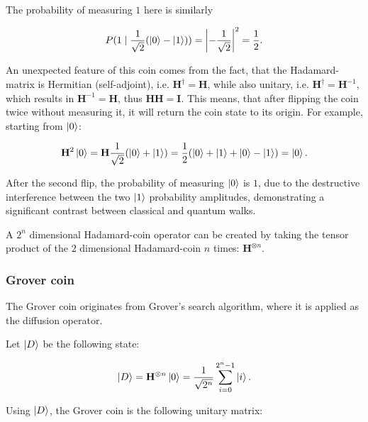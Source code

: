 The probability of measuring $1$ here is similarly

\begin{align*}
P(1 \mid \frac{1}{\sqrt{2}} (\ket{0} - \ket{1})) =
\left\lvert-\frac{1}{\sqrt{2}}\right\rvert^2 =
\frac{1}{2}.
\end{align*}

An unexpected feature of this coin comes from the fact, that the Hadamard-matrix is Hermitian (self-adjoint), i.e. $\mathbf{H}^{\dagger} = \mathbf{H}$, while also unitary, i.e. $\mathbf{H}^{\dagger} = \mathbf{H}^{-1}$, which results in $\mathbf{H}^{-1} = \mathbf{H}$, thus $\mathbf{H}\mathbf{H} = \mathbf{I}$. This means, that after flipping the coin twice without measuring it, it will return the coin state to its origin. For example, starting from $\ket{0}$:

\begin{align*}
 \mathbf{H}^2 \ket{0} = \mathbf{H}\frac{1}{\sqrt{2}}(\ket{0} + \ket{1}) = \frac{1}{2}(\ket{0} + \ket{1} + \ket{0} - \ket{1}) = \ket{0}.
\end{align*}

After the second flip, the probability of measuring $\ket{0}$ is $1$, due to the destructive interference between the two $\ket{1}$ probability amplitudes, demonstrating a significant contrast between classical and quantum walks.

\begin{definition}

A $2^n$ dimensional Hadamard-coin operator can be created by taking the tensor product of the $2$ dimensional Hadamard-coin $n$ times: $\mathbf{H}^{\otimes{}n}$.

\end{definition}

\subsubsection{Grover coin}

The Grover coin originates from Grover's search algorithm, where it is applied as the diffusion operator.

Let $\ket{D}$ be the following state:

\begin{align*}
\ket{D} = \mathbf{H}^{\otimes{}n}\ket{0} =
\frac{1}{\sqrt{2^n}} \sum\limits_{i=0}^{2^n-1} \ket{i}.
\end{align*}

Using $\ket{D}$, the Grover coin is the following unitary matrix:

